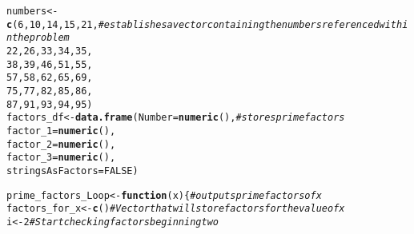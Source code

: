 \documentclass{article}\usepackage[]{graphicx}\usepackage[]{xcolor}
\makeatletter
\newcommand{\hlnum}[1]{\textcolor[rgb]{0.686,0.059,0.569}{#1}}%
\newcommand{\hlcom}[1]{\textcolor[rgb]{0.678,0.584,0.686}{\textit{#1}}}%
\newcommand{\hldef}[1]{\textcolor[rgb]{0.345,0.345,0.345}{#1}}%
\newcommand{\hlkwa}[1]{\textcolor[rgb]{0.161,0.373,0.58}{\textbf{#1}}}%
\newcommand{\hlkwb}[1]{\textcolor[rgb]{0.69,0.353,0.396}{#1}}%
\newcommand{\hlkwc}[1]{\textcolor[rgb]{0.333,0.667,0.333}{#1}}%
\newcommand{\hlkwd}[1]{\textcolor[rgb]{0.737,0.353,0.396}{\textbf{#1}}}%
\newenvironment{kframe}{%
 \def\at@end@of@kframe{}%
 \ifinner\ifhmode%
  \def\at@end@of@kframe{\end{minipage}}%
  \begin{minipage}{\columnwidth}%
 \fi\fi%
 \def\FrameCommand##1{\hskip\@totalleftmargin \hskip-\fboxsep
 \colorbox{shadecolor}{##1}\hskip-\fboxsep
     \hskip-\linewidth \hskip-\@totalleftmargin \hskip\columnwidth}%
 \MakeFramed {\advance\hsize-\width
   \@totalleftmargin\z@ \linewidth\hsize
   \@setminipage}}%
 {\par\unskip\endMakeFramed%
 \at@end@of@kframe}
\newenvironment{knitrout}{}{} %
\makeatother
\begin{document}
\begin{enumerate}
\begin{knitrout}\scriptsize
{}\color{fgcolor}\begin{kframe}
\begin{alltt}
\hldef{numbers} \hlkwb{<-} \hlkwd{c}\hldef{(}\hlnum{6}\hldef{,} \hlnum{10}\hldef{,} \hlnum{14}\hldef{,} \hlnum{15}\hldef{,} \hlnum{21}\hldef{,} \hlcom{#establishes a vector containing the numbers referenced within the problem}
             \hlnum{22}\hldef{,} \hlnum{26}\hldef{,} \hlnum{33}\hldef{,} \hlnum{34}\hldef{,} \hlnum{35}\hldef{,}
             \hlnum{38}\hldef{,} \hlnum{39}\hldef{,} \hlnum{46}\hldef{,} \hlnum{51}\hldef{,} \hlnum{55}\hldef{,}
             \hlnum{57}\hldef{,} \hlnum{58}\hldef{,} \hlnum{62}\hldef{,} \hlnum{65}\hldef{,} \hlnum{69}\hldef{,}
             \hlnum{75}\hldef{,} \hlnum{77}\hldef{,} \hlnum{82}\hldef{,} \hlnum{85}\hldef{,} \hlnum{86}\hldef{,}
             \hlnum{87}\hldef{,} \hlnum{91}\hldef{,} \hlnum{93}\hldef{,} \hlnum{94}\hldef{,} \hlnum{95}\hldef{)}
\hldef{factors_df} \hlkwb{<-} \hlkwd{data.frame}\hldef{(}\hlkwc{Number} \hldef{=} \hlkwd{numeric}\hldef{(),} \hlcom{#stores prime factors}
                 \hlkwc{factor_1} \hldef{=} \hlkwd{numeric}\hldef{(),}
                 \hlkwc{factor_2} \hldef{=} \hlkwd{numeric}\hldef{(),}
                 \hlkwc{factor_3} \hldef{=} \hlkwd{numeric} \hldef{(),}
                 \hlkwc{stringsAsFactors}\hldef{=}\hlnum{FALSE}\hldef{)}

\hldef{prime_factors_Loop} \hlkwb{<-} \hlkwa{function}\hldef{(}\hlkwc{x}\hldef{) \{} \hlcom{#outputs prime factors of x}
  \hldef{factors_for_x} \hlkwb{<-} \hlkwd{c}\hldef{()}   \hlcom{# Vector that will store factors for the value of x}
  \hldef{i} \hlkwb{<-} \hlnum{2}           \hlcom{# Start checking factors beginning two}


\end{alltt}
\end{kframe}
\end{knitrout}
\end{enumerate}
\end{document}

